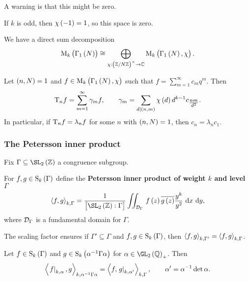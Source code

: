A warning is that this might be zero.

\begin{example*}
If $ k $ is odd, then $ \chi\br{-1} = 1 $, so this space is zero.
\end{example*}

We have a direct sum decomposition
$$ \M_k\br{\Gamma_1\br{N}} \cong \bigoplus_{\chi : \unit{N} \to \CC} \M_k\br{\Gamma_1\br{N}, \chi}. $$

\begin{proposition}
Let $ \br{n, N} = 1 $ and $ f \in \M_k\br{\Gamma_1\br{N}, \chi} $ such that $ f = \sum_{m = 1}^\infty c_mq^m $. Then
$$ \T_nf = \sum_{m = 1}^\infty \gamma_mf, \qquad \gamma_m = \sum_{d \mid \br{n, m}} \chi\br{d}d^{k - 1}c_{\tfrac{nm}{d^2}}. $$
In particular, if $ \mathrm{T}_nf = \lambda_nf $ for some $ n $ with $ \br{n, N} = 1 $, then $ c_n = \lambda_nc_1 $.
\end{proposition}

\pagebreak

\subsubsection{The Petersson inner product}

Fix $ \Gamma \subseteq \SL_2\br{\ZZ} $ a congruence subgroup.

\begin{definition}
For $ f, g \in \S_k\br{\Gamma} $ define the \textbf{Petersson inner product of weight $ k $ and level $ \Gamma $}
$$ \abr{f, g}_{k, \Gamma} = \dfrac{1}{\sbr{\SL_2\br{\ZZ} : \Gamma}}\iintd{\DDD_\Gamma}{f\br{z}\overline{g\br{z}}\dfrac{y^k}{y^2}}{x}{y}, $$
where $ \mathcal{D}_\Gamma $ is a fundamental domain for $ \Gamma $.
\end{definition}

\begin{note*}
The scaling factor ensures if $ \Gamma' \subseteq \Gamma $ and $ f, g \in \S_k\br{\Gamma} $, then $ \left\langle f, g \right\rangle_{k, \Gamma'} = \left\langle f, g \right\rangle_{k, \Gamma} $.
\end{note*}

\begin{proposition}
Let $ f \in \S_k\br{\Gamma} $ and $ g \in \S_k\br{\alpha^{-1}\Gamma\alpha} $ for $ \alpha \in \GL_2\br{\QQ}_+ $. Then
$$ \left\langle \left. f \right|_{k, \alpha}, g \right\rangle_{k, \alpha^{-1}\Gamma\alpha} = \left\langle f, \left. g \right|_{k, \alpha'} \right\rangle_{k, \Gamma}, \qquad \alpha' = \alpha^{-1}\det \alpha. $$
\end{proposition}

